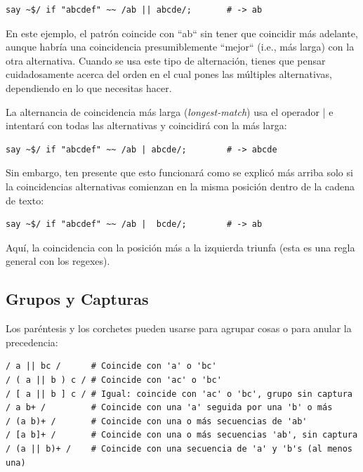 \begin{lstlisting}
say ~$/ if "abcdef" ~~ /ab || abcde/;       # -> ab
\end{lstlisting}
%

En este ejemplo, el patrón coincide con ``ab`` sin tener que
coincidir más adelante, aunque habría una coincidencia 
presumiblemente ``mejor`` (i.e., más larga) con la otra alternativa.
Cuando se usa este tipo de alternación, tienes que pensar 
cuidadosamente acerca del orden en el cual pones las múltiples
alternativas, dependiendo en lo que necesitas hacer.

La alternancia de coincidencia más larga (\emph{longest-match}) usa 
el operador \verb||| e intentará con todas las alternativas y 
coincidirá con la más larga:

\begin{lstlisting}
say ~$/ if "abcdef" ~~ /ab | abcde/;        # -> abcde
\end{lstlisting}
%

Sin embargo, ten presente que esto funcionará como se explicó
más arriba solo si la coincidencias alternativas comienzan 
en la misma posición dentro de la cadena de texto:

\begin{lstlisting}
say ~$/ if "abcdef" ~~ /ab |  bcde/;        # -> ab
\end{lstlisting}
%

Aquí, la coincidencia con la posición más a la izquierda 
triunfa (esta es una regla general con los regexes).


\subsection{Grupos y Capturas }

Los paréntesis y los corchetes pueden usarse para agrupar
cosas o para anular la precedencia:

\begin{lstlisting}
/ a || bc /      # Coincide con 'a' o 'bc'
/ ( a || b ) c / # Coincide con 'ac' o 'bc'
/ [ a || b ] c / # Igual: coincide con 'ac' o 'bc', grupo sin captura
/ a b+ /         # Coincide con una 'a' seguida por una 'b' o más
/ (a b)+ /       # Coincide con una o más secuencias de 'ab'
/ [a b]+ /       # Coincide con una o más secuencias 'ab', sin captura
/ (a || b)+ /    # Coincide con una secuencia de 'a' y 'b's (al menos una)
\end{lstlisting}
%

